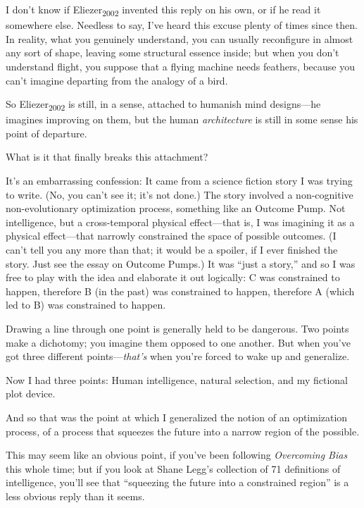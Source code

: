 {
 I don't know if Eliezer\textsubscript{2002}
invented this reply on his own, or if he read it somewhere else.
Needless to say, I've heard this excuse plenty of times
since then. In reality, what you genuinely understand, you can usually
reconfigure in almost any sort of shape, leaving some structural
essence inside; but when you don't understand flight,
you suppose that a flying machine needs feathers, because you
can't imagine departing from the analogy of a bird.}

{
 So Eliezer\textsubscript{2002} is still, in a sense, attached to
humanish mind designs---he imagines improving on them, but the human
\textit{architecture} is still in some sense his point of departure.}

{
 What is it that finally breaks this attachment?}

{
 It's an embarrassing confession: It came from a
science fiction story I was trying to write. (No, you
can't see it; it's not done.) The story
involved a non-cognitive non-evolutionary optimization process,
something like an Outcome Pump. Not intelligence, but a cross-temporal
physical effect---that is, I was imagining it as a physical
effect---that narrowly constrained the space of possible outcomes. (I
can't tell you any more than that; it would be a
spoiler, if I ever finished the story. Just see the essay on Outcome
Pumps.) It was ``just a story,'' and
so I was free to play with the idea and elaborate it out logically: C
was constrained to happen, therefore B (in the past) was constrained to
happen, therefore A (which led to B) was constrained to happen.}

{
 Drawing a line through one point is generally held to be
dangerous. Two points make a dichotomy; you imagine them opposed to one
another. But when you've got three different
points---\textit{that's} when you're
forced to wake up and generalize.}

{
 Now I had three points: Human intelligence, natural selection, and
my fictional plot device.}

{
 And so that was the point at which I generalized the notion of an
optimization process, of a process that squeezes the future into a
narrow region of the possible.}

{
 This may seem like an obvious point, if you've
been following \textit{Overcoming Bias} this whole time; but if you
look at Shane Legg's collection of 71 definitions of
intelligence, you'll see that
``squeezing the future into a constrained
region'' is a less obvious reply than it seems.}


